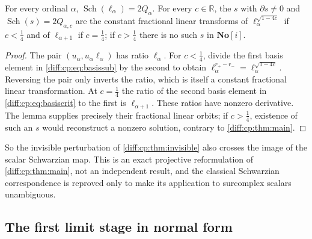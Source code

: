 \documentclass[11pt,letterpaper]{article}
\numberwithin{equation}{section}
\theoremstyle{definition}
\theoremstyle{remark}
\newcommand{\SC}{\mathbf{No}[i]}
\newcommand{\R}{\mathbb R}
\newcommand{\der}{\partial}
\newcommand{\Sch}{\operatorname{Sch}}
\begin{document}
\begin{corollary}
\label{diff:cp:cor:schwarzian}
For every ordinal $\alpha$, $\Sch(\ell_{\alpha})=2Q_{\alpha}$.
For every $c\in\R$, the $s$ with
$\der s\neq0$ and $\Sch(s)=2Q_{\alpha,c}$ are the constant fractional linear
transforms of $\ell_{\alpha}^{\sqrt{1-4c}}$ if $c<\frac14$ and of
$\ell_{\alpha+1}$ if $c=\frac14$; if $c>\frac14$ there is no such $s$ in $\SC$.
\end{corollary}
\begin{proof}
The pair $(u_\alpha,u_\alpha\ell_\alpha)$ has ratio
$\ell_\alpha$. For $c<\frac14$, divide the first basis element
in \cref{diff:cp:eq:basissub} by the second to obtain
$\ell_\alpha^{r_+-r_-}=\ell_\alpha^{\sqrt{1-4c}}$.
Reversing the pair only inverts the ratio, which is itself a
constant fractional linear transformation. At $c=\frac14$ the
ratio of the second basis element in \cref{diff:cp:eq:basiscrit}
to the first is $\ell_{\alpha+1}$. These ratios have nonzero
derivative. The lemma supplies precisely their fractional linear
orbits; if $c>\frac14$, existence of such an $s$ would reconstruct
a nonzero solution, contrary to \cref{diff:cp:thm:main}.
\end{proof}

So the invisible perturbation of \cref{diff:cp:thm:invisible} also crosses the
image of the scalar Schwarzian map. This is an exact projective reformulation
of \cref{diff:cp:thm:main}, not an independent result, and the classical
Schwarzian correspondence is reproved only to make its application to
surcomplex scalars unambiguous.

\subsection{The first limit stage in normal form}
\label{diff:cp:sub:omega}
\end{document}
